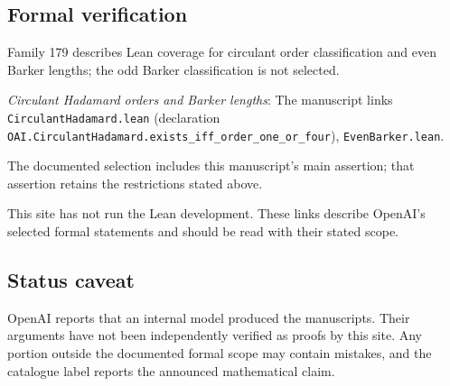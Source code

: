 \documentclass[11pt]{article}
\begin{document}
\subsection{Formal verification}
Family 179 describes Lean coverage for circulant order classification and even Barker lengths; the odd Barker classification is not selected.

\textit{Circulant Hadamard orders and Barker lengths}: The manuscript links \texttt{CirculantHadamard.lean} (declaration \texttt{OAI.CirculantHadamard.exists\_iff\_order\_one\_or\_four}), \texttt{EvenBarker.lean}.

The documented selection includes this manuscript’s main assertion; that assertion retains the restrictions stated above.

This site has not run the Lean development. These links describe OpenAI’s selected formal statements and should be read with their stated scope.

\subsection{Status caveat}
OpenAI reports that an internal model produced the manuscripts. Their arguments have not been independently verified as proofs by this site. Any portion outside the documented formal scope may contain mistakes, and the catalogue label reports the announced mathematical claim.
\end{document}
